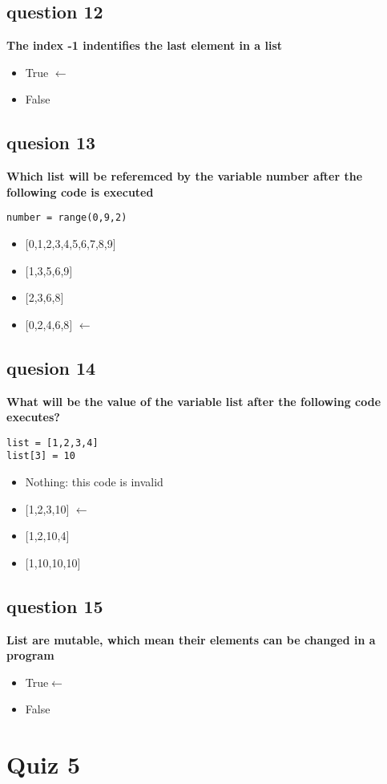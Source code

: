 \documentclass[10pt]{article}
\begin{document}
\subsection*{question 12}
\textbf{The index -1 indentifies the last element in a list}
\begin{itemize}
\item True $\leftarrow$
\item False
\end{itemize}
\subsection*{quesion 13}
\textbf{Which list will be referemced by the variable number after the following code is executed}
\begin{verbatim}
number = range(0,9,2)
\end{verbatim}
\begin{itemize}
\item $[$0,1,2,3,4,5,6,7,8,9$]$
\item $[$1,3,5,6,9$]$
\item $[$2,3,6,8$]$
\item $[$0,2,4,6,8$]$ $\leftarrow$
\end{itemize}
\subsection*{quesion 14}
\textbf{What will be the value of the variable list after the following code executes?}
\begin{verbatim}
list = [1,2,3,4]
list[3] = 10
\end{verbatim}
\begin{itemize}
\item Nothing: this code is invalid
\item $[$1,2,3,10$]$ $\leftarrow$
\item $[$1,2,10,4$]$
\item $[$1,10,10,10$]$
\end{itemize}
\subsection*{question 15}
\textbf{List are mutable, which mean their elements can be changed in a program}
\begin{itemize}
\item True$\leftarrow$
\item False
\end{itemize}
\break
\section*{Quiz 5}
\end{document}

